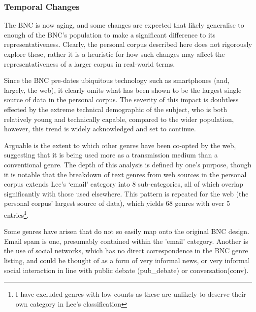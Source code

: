 %






\subsubsection{Temporal Changes}
The BNC is now aging, and some changes are expected that likely generalise to enough of the BNC's population to make a significant difference to its representativeness.  Clearly, the personal corpus described here does not rigorously explore these, rather it is a heuristic for how such changes may affect the representativeness of a larger corpus in real-world terms.


Since the BNC pre-dates ubiquitous technology such as smartphones (and, largely, the web), it clearly omits what has been shown to be the largest single source of data in the personal corpus.  The severity of this impact is doubtless effected by the extreme technical demographic of the subject, who is both relatively young and technically capable, compared to the wider population, however, this trend is widely acknowledged and set to continue.

Arguable is the extent to which other genres have been co-opted by the web, suggesting that it is being used more as a transmission medium than a conventional genre.  The depth of this analysis is defined by one's purpose, though it is notable that the breakdown of text genres from web sources in the personal corpus extends Lee's `email' category into 8 sub-categories, all of which overlap significantly with those used elsewhere.  This pattern is repeated for the web (the personal corpus' largest source of data), which yields 68 genres with over 5 entries\footnote{I have excluded genres with low counts as these are unlikely to deserve their own category in Lee's classification}.

Some genres have arisen that do not so easily map onto the original BNC design.  Email spam is one, presumably contained within the 'email' category.  Another is the use of social networks, which has no direct correspondence in the BNC genre listing, and could be thought of as a form of very informal news, or very informal social interaction in line with public debate (pub\_debate) or conversation(conv).








